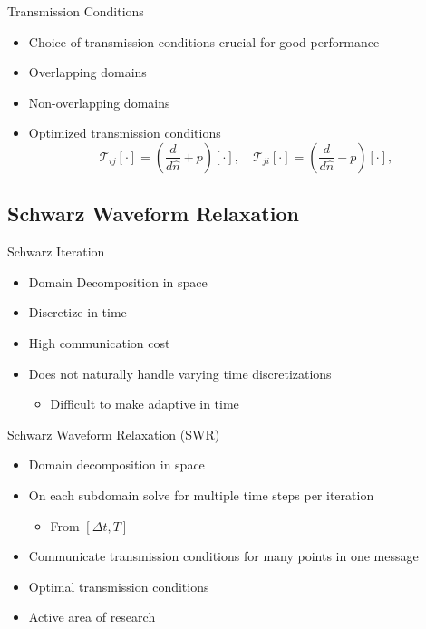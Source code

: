 \documentclass[]{beamer}
\begin{document}
\begin{frame}{Transmission Conditions}

  \begin{itemize}
  \item Choice of transmission conditions crucial for good performance
  \item Overlapping domains
  \item Non-overlapping domains
  \item Optimized transmission conditions
    \[
    \mathcal{T}_{ij}[\cdot] = \left(\frac{d}{d\hat{n}} + p\right) [\cdot], 
    \quad
    \mathcal{T}_{ji}[\cdot] = \left(\frac{d}{d\hat{n}} - p\right) [\cdot],
    \]      
  \end{itemize}
  
\end{frame}


\subsection{Schwarz Waveform Relaxation}

\begin{frame}{Schwarz Iteration}

  \begin{itemize}
  \item Domain Decomposition in space
  \item Discretize in time
  \item High communication cost
  \item Does not naturally handle varying time discretizations
    \begin{itemize}
    \item Difficult to make adaptive in time
    \end{itemize}
  \end{itemize}


\end{frame}


\begin{frame}{Schwarz Waveform Relaxation (SWR)}

  \begin{itemize}
  \item<1-> Domain decomposition in space
  \item<1-> On each subdomain solve for multiple time steps per iteration    
    \begin{itemize}
    \item From $[\Delta t,T]$
    \end{itemize}
  \item<2-> Communicate transmission conditions for many points in one message
  \item<2-> Optimal transmission conditions 
  \item<2-> Active area of research

  \end{itemize}

\end{frame}
\end{document}
